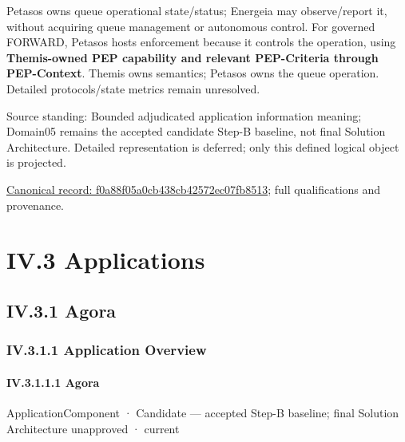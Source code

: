 Petasos owns queue operational state/status; Energeia may observe/report it,
without acquiring queue management or autonomous control. For governed FORWARD,
Petasos hosts enforcement because it controls the operation, using \textbf{Themis-owned
PEP capability and relevant PEP-Criteria through PEP-Context}. Themis owns semantics; Petasos
owns the queue operation. Detailed protocols/state metrics remain unresolved.



Source standing: Bounded adjudicated application information meaning; Domain05 remains the accepted candidate Step-B baseline, not final Solution Architecture. Detailed representation is deferred; only this defined logical object is projected.


{\footnotesize \href{../../../../continuum/application/data-object/f0a88f05a0cb438cb42572ec07fb8513.md}{Canonical record: f0a88f05a0cb438cb42572ec07fb8513}; full qualifications and provenance.}\par
\chapter*{IV.3 Applications}
\label{navigation:IV.3}

\section*{IV.3.1 Agora}
\label{navigation:IV.3.1}

\subsection*{IV.3.1.1 Application Overview}
\label{navigation:IV.3.1.1}

\subsubsection*{IV.3.1.1.1 Agora}
\label{navigation:IV.3.1.1.1}

\label{element:d1c4053e68384080b8eb79d2008632ba}
{\small ApplicationComponent · Candidate — accepted Step-B baseline; final Solution Architecture unapproved · current}\par


